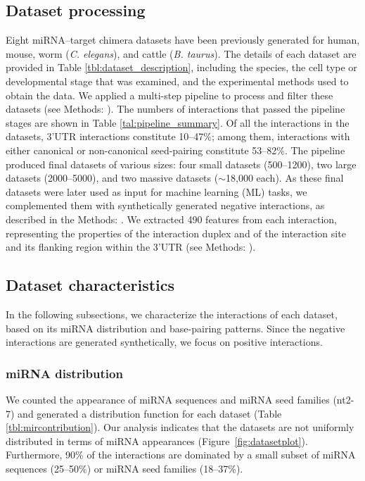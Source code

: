 \documentclass{bmcart}
\begin{document}
\subsection*{Dataset processing}
Eight miRNA--target chimera datasets have been previously generated for human, mouse, worm (\textit{C. elegans}), and cattle (\textit{B. taurus}).
The details of each dataset are provided in Table \ref{tbl:dataset_description}, including the species, the cell type or developmental stage that was examined, and the experimental methods used to obtain the data. We applied a multi-step pipeline to process and filter these datasets (see Methods: ).
The numbers of interactions that passed the pipeline stages are shown in Table \ref{tal:pipeline_summary}. Of all the interactions in the datasets, 3'UTR interactions constitute 10--47\%; among them, interactions with either canonical or non-canonical seed-pairing constitute 53--82\%. The pipeline produced final datasets of various sizes: four small datasets (500--1200), two large datasets (2000--5000), and two massive datasets ($\sim$18,000 each). As these final datasets were later used as input for machine learning (ML) tasks, we complemented them with synthetically generated negative interactions, as described in the Methods: . We extracted 490 features from each interaction, representing the properties of the interaction duplex and of the interaction site and its flanking region within the 3'UTR (see Methods: ).


\subsection*{Dataset characteristics}
In the following subsections, we characterize the interactions of each dataset, based on its miRNA distribution and base-pairing patterns. Since the negative interactions are generated synthetically, we focus on positive interactions.

\subsubsection*{miRNA distribution}
We counted the appearance of miRNA sequences and miRNA seed families (nt2-7) and generated a distribution function for each dataset (Table \ref{tbl:mircontribution}). Our analysis indicates that the datasets are not uniformly distributed in terms of miRNA appearances (Figure~\ref{fig:datasetplot}). Furthermore, 90\% of the interactions are dominated by a small subset of miRNA sequences (25--50\%) or miRNA seed families (18--37\%).
\end{document}
